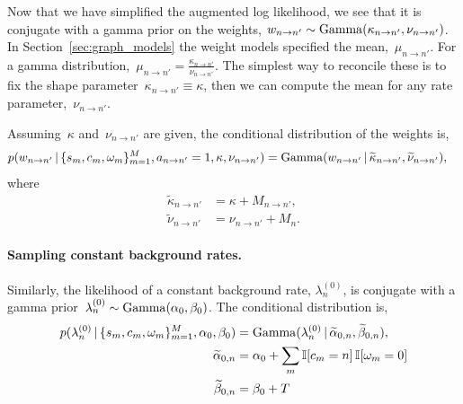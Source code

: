 Now that we have simplified the augmented log likelihood, we see that
it is conjugate with a gamma prior on the weights, ${w_{n \to n'} \sim
  \mathrm{Gamma}(\kappa_{n \to n'}, \nu_{n \to n'}})$.  In
Section~\ref{sec:graph_models} the weight models specified the
mean,~$\mu_{n \to n'}$.  For a gamma distribution,~${\mu_{n \to n'} =
  \frac{\kappa_{n \to n'}}{\nu_{n \to n'}}}$. The simplest way to
reconcile these is to fix the shape parameter~${\kappa_{n \to n'}
  \equiv \kappa}$, then we can compute the mean for any rate
parameter,~$\nu_{n \to n'}$.

Assuming~$\kappa$ and~$\nu_{n \to n'}$ are given,
the conditional distribution of the weights is,
\begin{align*}
  p(w_{n \to n'}\,|\, \{s_m,c_m,\omega_m\}_{m=1}^M, a_{n\to n'}=1, \kappa, \nu_{n \to n'})
  &= 
  \mathrm{Gamma}(w_{n \to n'} \,|\, \widetilde{\kappa}_{n \to n'}, \widetilde{\nu}_{n \to n'}),
\end{align*}
where
\begin{align*}
  \widetilde{\kappa}_{n \to n'} &= \kappa + M_{n \to n'}, \\
  \widetilde{\nu}_{n \to n'} &= \nu_{n \to n'} + M_n.
\end{align*}


\paragraph{Sampling constant background rates.}
Similarly, the likelihood of a constant background rate,
${\lambda^{(0)}_{n}}$, is conjugate with a gamma
prior~${\lambda^{(0)}_{n} \sim
  \mathrm{Gamma}(\alpha_0,\beta_0)}$.  The conditional
distribution is,
\begin{align*}
  p(\lambda^{(0)}_{n} \,|\, \{s_m,c_m, \omega_m\}_{m=1}^M, \alpha_0, \beta_0)
  &=
  \mathrm{Gamma}(\lambda^{(0)}_{n} \,|\, \widetilde{\alpha}_{0,n},  \widetilde{\beta}_{0,n}),\\
  \widetilde{\alpha}_{0,n} &= \alpha_0 + \sum_m \mathbb{I}[c_m = n] \, \mathbb{I}[\omega_m=0] \\
  \widetilde{\beta}_{0,n} &= \beta_0 + T
\end{align*}


